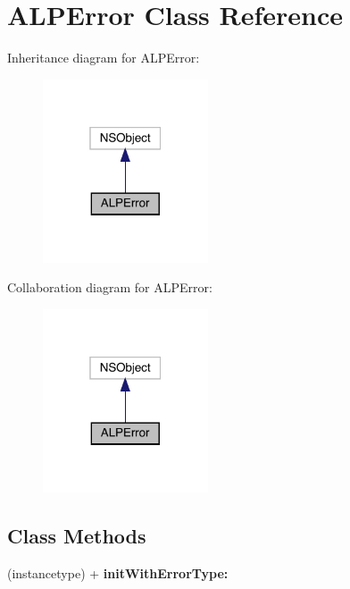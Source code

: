 \hypertarget{interface_a_l_p_error}{}\section{A\+L\+P\+Error Class Reference}
\label{interface_a_l_p_error}


Inheritance diagram for A\+L\+P\+Error\+:\nopagebreak
\begin{figure}[H]
\begin{center}
\leavevmode
\includegraphics[width=139pt]{interface_a_l_p_error__inherit__graph}
\end{center}
\end{figure}


Collaboration diagram for A\+L\+P\+Error\+:\nopagebreak
\begin{figure}[H]
\begin{center}
\leavevmode
\includegraphics[width=139pt]{interface_a_l_p_error__coll__graph}
\end{center}
\end{figure}
\subsection*{Class Methods}
\begin{DoxyCompactItemize}
\item 
\mbox{\label{interface_a_l_p_error_a92e11f9e7affd00ab64c5edca3e58689}} 
(instancetype) + {\bfseries init\+With\+Error\+Type\+:}
\end{DoxyCompactItemize}
